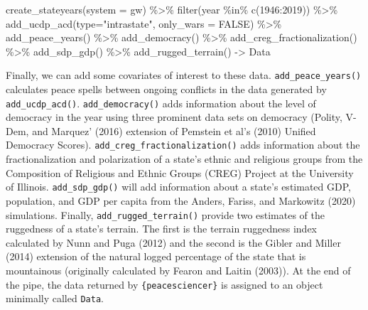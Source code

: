 \documentclass[
  11pt,
]{article}
\newenvironment{Shaded}{\begin{snugshade}}{\end{snugshade}}
\newcommand{\AttributeTok}[1]{\textcolor[rgb]{0.77,0.63,0.00}{#1}}
\newcommand{\ConstantTok}[1]{\textcolor[rgb]{0.00,0.00,0.00}{#1}}
\newcommand{\DecValTok}[1]{\textcolor[rgb]{0.00,0.00,0.81}{#1}}
\newcommand{\FunctionTok}[1]{\textcolor[rgb]{0.00,0.00,0.00}{#1}}
\newcommand{\NormalTok}[1]{#1}
\newcommand{\OtherTok}[1]{\textcolor[rgb]{0.56,0.35,0.01}{#1}}
\newcommand{\SpecialCharTok}[1]{\textcolor[rgb]{0.00,0.00,0.00}{#1}}
\newcommand{\StringTok}[1]{\textcolor[rgb]{0.31,0.60,0.02}{#1}}
\begin{document}
\begin{Shaded}
\begin{Highlighting}[]
\FunctionTok{create\_stateyears}\NormalTok{(}\AttributeTok{system =} \StringTok{\textquotesingle{}gw\textquotesingle{}}\NormalTok{) }\SpecialCharTok{\%\textgreater{}\%}
  \FunctionTok{filter}\NormalTok{(year }\SpecialCharTok{\%in\%} \FunctionTok{c}\NormalTok{(}\DecValTok{1946}\SpecialCharTok{:}\DecValTok{2019}\NormalTok{)) }\SpecialCharTok{\%\textgreater{}\%}
  \FunctionTok{add\_ucdp\_acd}\NormalTok{(}\AttributeTok{type=}\StringTok{"intrastate"}\NormalTok{, }\AttributeTok{only\_wars =} \ConstantTok{FALSE}\NormalTok{) }\SpecialCharTok{\%\textgreater{}\%}
  \FunctionTok{add\_peace\_years}\NormalTok{() }\SpecialCharTok{\%\textgreater{}\%}
  \FunctionTok{add\_democracy}\NormalTok{() }\SpecialCharTok{\%\textgreater{}\%}
  \FunctionTok{add\_creg\_fractionalization}\NormalTok{() }\SpecialCharTok{\%\textgreater{}\%}
  \FunctionTok{add\_sdp\_gdp}\NormalTok{() }\SpecialCharTok{\%\textgreater{}\%}
  \FunctionTok{add\_rugged\_terrain}\NormalTok{() }\OtherTok{{-}\textgreater{}}\NormalTok{ Data}
\end{Highlighting}
\end{Shaded}

Finally, we can add some covariates of interest to these data. \texttt{add\_peace\_years()} calculates peace spells between ongoing conflicts in the data generated by \texttt{add\_ucdp\_acd()}. \texttt{add\_democracy()} adds information about the level of democracy in the year using three prominent data sets on democracy (Polity, V-Dem, and Marquez' (2016) extension of Pemstein et al's (2010) Unified Democracy Scores). \texttt{add\_creg\_fractionalization()} adds information about the fractionalization and polarization of a state's ethnic and religious groups from the Composition of Religious and Ethnic Groups (CREG) Project at the University of Illinois. \texttt{add\_sdp\_gdp()} will add information about a state's estimated GDP, population, and GDP per capita from the Anders, Fariss, and Markowitz (2020) simulations. Finally, \texttt{add\_rugged\_terrain()} provide two estimates of the ruggedness of a state's terrain. The first is the terrain ruggedness index calculated by Nunn and Puga (2012) and the second is the Gibler and Miller (2014) extension of the natural logged percentage of the state that is mountainous (originally calculated by Fearon and Laitin (2003)). At the end of the pipe, the data returned by \texttt{\{peacesciencer\}} is assigned to an object minimally called \texttt{Data}.
\end{document}
